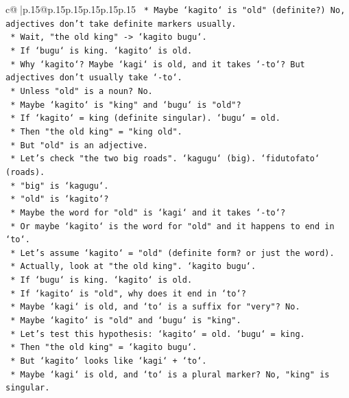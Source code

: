 \documentclass{article}
\begin{document}
{\begin{supertabular}{c@{$\;$}|p{.15\linewidth}@{}p{.15\linewidth}p{.15\linewidth}p{.15\linewidth}p{.15\linewidth}p{.15\linewidth}}
{{{\texttt{        *   Maybe `kagito` is "old" (definite?) No, adjectives don't take definite markers usually.} \\
\texttt{        *   Wait, "the old king" {-}> `kagito bugu`.} \\
\texttt{        *   If `bugu` is king. `kagito` is old.} \\
\texttt{        *   Why `kagito`? Maybe `kagi` is old, and it takes `{-}to`? But adjectives don't usually take `{-}to`.} \\
\texttt{        *   Unless "old" is a noun? No.} \\
\texttt{        *   Maybe `kagito` is "king" and `bugu` is "old"?} \\
\texttt{        *   If `kagito` = king (definite singular). `bugu` = old.} \\
\texttt{        *   Then "the old king" = "king old".} \\
\texttt{        *   But "old" is an adjective.} \\
\texttt{        *   Let's check "the two big roads". `kagugu` (big). `fidutofato` (roads).} \\
\texttt{        *   "big" is `kagugu`.} \\
\texttt{        *   "old" is `kagito`?} \\
\texttt{        *   Maybe the word for "old" is `kagi` and it takes `{-}to`?} \\
\texttt{        *   Or maybe `kagito` is the word for "old" and it happens to end in `to`.} \\
\texttt{        *   Let's assume `kagito` = "old" (definite form? or just the word).} \\
\texttt{        *   Actually, look at "the old king". `kagito bugu`.} \\
\texttt{        *   If `bugu` is king. `kagito` is old.} \\
\texttt{        *   If `kagito` is "old", why does it end in `to`?} \\
\texttt{        *   Maybe `kagi` is old, and `to` is a suffix for "very"? No.} \\
\texttt{        *   Maybe `kagito` is "old" and `bugu` is "king".} \\
\texttt{        *   Let's test this hypothesis: `kagito` = old. `bugu` = king.} \\
\texttt{        *   Then "the old king" = `kagito bugu`.} \\
\texttt{        *   But `kagito` looks like `kagi` + `to`.} \\
\texttt{        *   Maybe `kagi` is old, and `to` is a plural marker? No, "king" is singular.} \\
}}}
\end{supertabular}}
\end{document}
